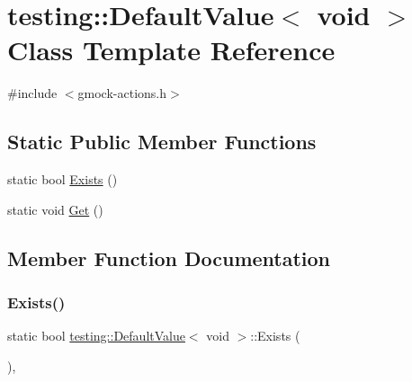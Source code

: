 \hypertarget{classtesting_1_1_default_value_3_01void_01_4}{}\section{testing\+:\+:Default\+Value$<$ void $>$ Class Template Reference}
\label{classtesting_1_1_default_value_3_01void_01_4}


{\ttfamily \#include $<$gmock-\/actions.\+h$>$}

\subsection*{Static Public Member Functions}
\begin{DoxyCompactItemize}
\item 
static bool \hyperlink{classtesting_1_1_default_value_3_01void_01_4_ae18ea46cbf928b820c91f15fa7aa317b}{Exists} ()
\item 
static void \hyperlink{classtesting_1_1_default_value_3_01void_01_4_acda4c367a5b0c0cfb28bc2289f385eed}{Get} ()
\end{DoxyCompactItemize}


\subsection{Member Function Documentation}
\mbox{\label{classtesting_1_1_default_value_3_01void_01_4_ae18ea46cbf928b820c91f15fa7aa317b}} 
\subsubsection{\texorpdfstring{Exists()}{Exists()}}
{\footnotesize\ttfamily static bool \hyperlink{classtesting_1_1_default_value}{testing\+::\+Default\+Value}$<$ void $>$\+::Exists (\begin{DoxyParamCaption}{ }\end{DoxyParamCaption})\hspace{0.3cm}{\ttfamily [inline]}, {\ttfamily [static]}}

\mbox{\label{classtesting_1_1_default_value_3_01void_01_4_acda4c367a5b0c0cfb28bc2289f385eed}} 
